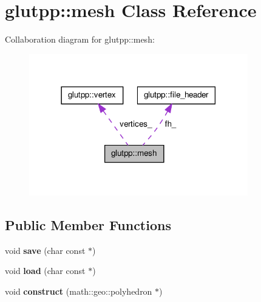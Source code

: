 \hypertarget{classglutpp_1_1mesh}{\section{glutpp\-:\-:mesh \-Class \-Reference}
\label{classglutpp_1_1mesh}
}


\-Collaboration diagram for glutpp\-:\-:mesh\-:\nopagebreak
\begin{figure}[H]
\begin{center}
\leavevmode
\includegraphics[width=270pt]{classglutpp_1_1mesh__coll__graph}
\end{center}
\end{figure}
\subsection*{\-Public \-Member \-Functions}
\begin{DoxyCompactItemize}
\item 
\hypertarget{classglutpp_1_1mesh_a80555f3c7fe096015bbd3349742372cf}{void {\bfseries save} (char const $\ast$)}\label{classglutpp_1_1mesh_a80555f3c7fe096015bbd3349742372cf}

\item 
\hypertarget{classglutpp_1_1mesh_a15e84ee2548fc25bf38bf170d9ef1473}{void {\bfseries load} (char const $\ast$)}\label{classglutpp_1_1mesh_a15e84ee2548fc25bf38bf170d9ef1473}

\item 
\hypertarget{classglutpp_1_1mesh_a38ac06e9bf9628f098a1c59467163abc}{void {\bfseries construct} (math\-::geo\-::polyhedron $\ast$)}\label{classglutpp_1_1mesh_a38ac06e9bf9628f098a1c59467163abc}

\end{DoxyCompactItemize}
